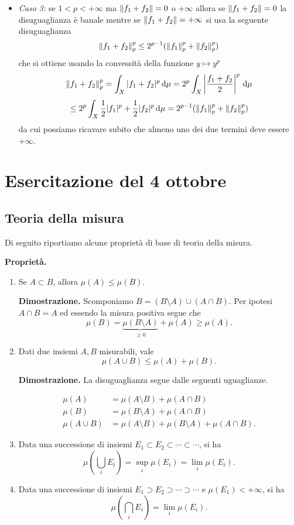 \documentclass[a4paper, 12pt]{report}
\begin{document}
\begin{itemize}
	\item \textit{Caso 3:} se $1 < p < +\infty$ ma $\left\lVert f_1 + f_2 \right\rVert = 0$ o $+\infty$ allora se $\left\lVert f_1 + f_2 \right\rVert = 0$ la disuguaglianza è banale mentre se $\left\lVert f_1 + f_2 \right\rVert = +\infty$ si usa la seguente disuguaglianza
		$$
		\left\lVert f_1 + f_2 \right\rVert_p^p \leq 2^{p-1} (\left\lVert f_1 \right\rVert_p^p + \left\lVert f_2 \right\rVert_p^p)
		$$
		che si ottiene usando la convessità della funzione $y \mapsto y^p$
		$$
		\left\lVert f_1 + f_2 \right\rVert_p^p 
		= \int_X |f_1 + f_2|^p \,\mathrm{d} \mu 
		= 2^p \int_X \left| \frac{f_1 + f_2}{2} \right|^p \,\mathrm{d} \mu 
		$$
		$$
		\leq 2^p \int_X \frac{1}{2} |f_1|^p + \frac{1}{2}|f_2|^p \,\mathrm{d} \mu 
		= 2^{p-1} (\left\lVert f_1 \right\rVert_p^p + \left\lVert f_2 \right\rVert_p^p)
		$$
		da cui possiamo ricavare subito che almeno uno dei due termini deve essere $+\infty$.

\end{itemize}

\section{Esercitazione del 4 ottobre}

\subsection*{Teoria della misura}

Di seguito riportiamo alcune proprietà di base di teoria della misura.

\textbf{Proprietà.}

\begin{enumerate}
\item Se $A \subset B$, allora $\mu(A) \leq \mu(B)$.

\textbf{Dimostrazione.}
Scomponiamo $B = (B \setminus A) \cup (A \cap B)$. Per ipotesi $A \cap B = A$ ed essendo la misura positiva segue che
$$
	\mu(B) = \underbrace{\mu(B \setminus A)}_{\geq 0} + \mu(A) \geq \mu(A).
$$

\item \label{item:misura_unione_finita} Dati due insiemi $A,B$ misurabili, vale
$$
	\mu(A \cup B) \leq \mu(A) + \mu(B).
$$

\textbf{Dimostrazione.}
La disuguaglianza segue dalle seguenti uguaglianze.

\begin{align*}
	\mu(A) & = \mu(A \setminus B) + \mu(A \cap B) \\
	\mu(B) & = \mu(B \setminus A) + \mu(A \cap B) \\
	\mu(A \cup B) & = \mu(A \setminus B ) + \mu(B \setminus A) + \mu(A \cap B).
\end{align*}

\item Data una successione di insiemi $E_1 \subset E_2 \subset \cdots \subset \cdots$, si ha
$$
	\mu \left( \bigcup_{i} E_i \right) = \sup_i \mu(E_i) = \lim_i \mu (E_i).
$$

\item Data una successione di insiemi $E_1 \supset E_2 \supset \cdots \supset \cdots$ e $\mu(E_1) < +\infty$, si ha
$$
	\mu \left( \bigcap_{i} E_i \right) = \lim_i \mu (E_i).
$$
\end{enumerate}
\end{document}
